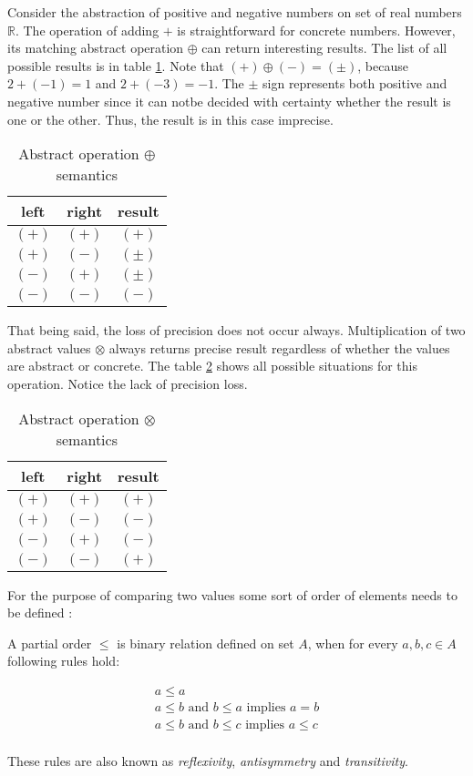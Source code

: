 \documentclass[12pt,final,oneside]{fithesis2}
\theoremstyle{definition}
\begin{document}
Consider the abstraction of positive and negative numbers on set of real numbers
$\mathbb{R}$. The operation of adding $+$ is straightforward for concrete numbers.
However, its matching abstract operation $\oplus$ can return interesting results.
The list of all possible results is in table \ref{tab:abstractplus}. Note that
$(+) \oplus (-) = (\pm)$, because $2 + (-1) = 1$ and $2 + (-3) = -1$. The $\pm$
sign represents both positive and negative number since it can notbe decided with
certainty whether the result is one or the other. Thus, the result is in this case
imprecise.

\begin{table}[h]
\centering
\begin{tabular}{c|c|c}
left  & right & result \\
\hline
$(+)$ & $(+)$ & $(+)$ \\
$(+)$ & $(-)$ & $(\pm)$ \\
$(-)$ & $(+)$ & $(\pm)$ \\
$(-)$ & $(-)$ & $(-)$ \\
\end{tabular}
\caption{Abstract operation $\oplus$ semantics}
\label{tab:abstractplus}
\end{table}

That being said, the loss of precision does not occur always. Multiplication of
two abstract values $\otimes$ always returns precise result regardless of whether
the values are abstract or concrete. The table \ref{tab:abstractmult} shows all
possible situations for this operation. Notice the lack of precision loss.

\begin{table}[h]
\centering
\begin{tabular}{c|c|c}
left & right & result \\
\hline
$(+)$ & $(+)$ & $(+)$ \\
$(+)$ & $(-)$ & $(-)$ \\
$(-)$ & $(+)$ & $(-)$ \\
$(-)$ & $(-)$ & $(+)$ \\
\end{tabular}
\caption{Abstract operation $\otimes$ semantics}
\label{tab:abstractmult}
\end{table}

For the purpose of comparing two values some sort of order of elements needs to
be defined \cite{Burris81-1}:

\begin{definintion}
A partial order $\leq$ is binary relation defined on set $A$, when for every
$a, b, c \in A$ following rules hold:

\begin{align*}
a \leq a \\
a \leq b \text{ and } b \leq a \text{ implies } a = b \\
a \leq b \text{ and } b \leq c \text{ implies } a \leq c \\
\end{align*}

These rules are also known as \textit{reflexivity}, \textit{antisymmetry} and
\textit{transitivity}.

\end{definintion}
\end{document}

